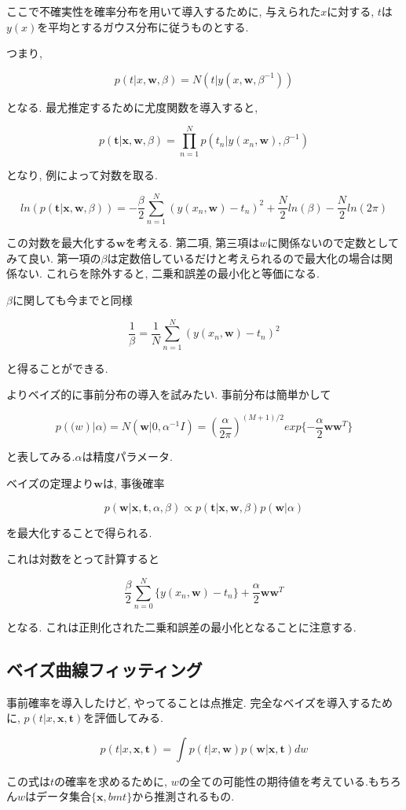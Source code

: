 ここで不確実性を確率分布を用いて導入するために, 与えられた$x$に対する, $t$は$y(x)$を平均とするガウス分布に従うものとする.

つまり,

$$ p(t|x, \bm{w}, \beta) = N(t|y(x, \bm{w}, \beta^{-1})) $$

となる.
最尤推定するために尤度関数を導入すると,

$$ p(\bm{t}|\bm{x}, \bm{w}, \beta) = \prod_{n=1}^N p(t_n|y(x_n, \bm{w}), \beta^{-1}) $$

となり, 例によって対数を取る.

$$ ln(p(\bm{t}|\bm{x}, \bm{w}, \beta)) = -\frac{\beta}{2}\sum^N_{n=1}(y(x_n, \bm{w})-t_n)^2 + \frac{N}{2}ln(\beta) - \frac{N}{2}ln(2\pi) $$

この対数を最大化する$\bm{w}$を考える. 第二項, 第三項は$w$に関係ないので定数としてみて良い. 第一項の$\beta$は定数倍しているだけと考えられるので最大化の場合は関係ない. これらを除外すると, 二乗和誤差の最小化と等価になる.

$\beta$に関しても今までと同様

$$ \frac{1}{\beta} = \frac{1}{N}\sum_{n=1}^{N}(y(x_n, \bm{w}) - t_n)^2 $$

と得ることができる.

よりベイズ的に事前分布の導入を試みたい.
事前分布は簡単かして

$$ p(\bm(w)|\alpha) = N(\bm{w}|0, \alpha^{-1} I) = (\frac{\alpha}{2\pi})^{(M+1)/2}exp\{ -\frac{\alpha}{2}\bm{w}\bm{w}^T \} $$

と表してみる.$\alpha$は精度パラメータ.

ベイズの定理より$\bm{w}$は, 事後確率

$$ p(\bm{w}|\bm{x}, \bm{t}, \alpha, \beta) \propto p(\bm{t}|\bm{x}, \bm{w}, \beta)p(\bm{w}|\alpha) $$

を最大化することで得られる.

これは対数をとって計算すると

$$ \frac{\beta}{2}\sum_{n=0}^N\{ y(x_n, \bm{w}) - t_n \} + \frac{\alpha}{2}\bm{w}\bm{w}^T $$

となる. これは正則化された二乗和誤差の最小化となることに注意する.

\subsection{ベイズ曲線フィッティング}

事前確率を導入したけど, やってることは点推定. 完全なベイズを導入するために, $p(t|x, \bm{x}, \bm{t})$を評価してみる.

$$ p(t|x, \bm{x}, \bm{t}) = \int p(t|x,\bm{w})p(\bm{w}|\bm{x}, \bm{t})dw $$

この式は$t$の確率を求めるために, $w$の全ての可能性の期待値を考えている.もちろん$w$はデータ集合$\{\bm{x}, bm{t}\}$から推測されるもの.


\newpage